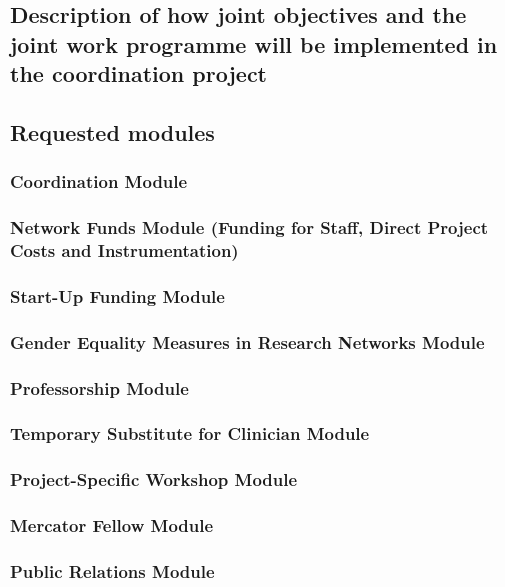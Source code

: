 \documentclass{scrartcl}
\begin{document}
\subsection{Description of how joint objectives and the joint work programme will be implemented in the coordination project}

\subsection{Requested modules}

\subsubsection{Coordination Module}

\subsubsection{Network Funds Module (Funding for Staff, Direct Project Costs and Instrumentation)}

\subsubsection{Start-Up Funding Module}

\subsubsection{Gender Equality Measures in Research Networks Module}

\subsubsection{Professorship Module}

\subsubsection{Temporary Substitute for Clinician Module}

\subsubsection{Project-Specific Workshop Module}

\subsubsection{Mercator Fellow Module}

\subsubsection{Public Relations Module}
\end{document}
